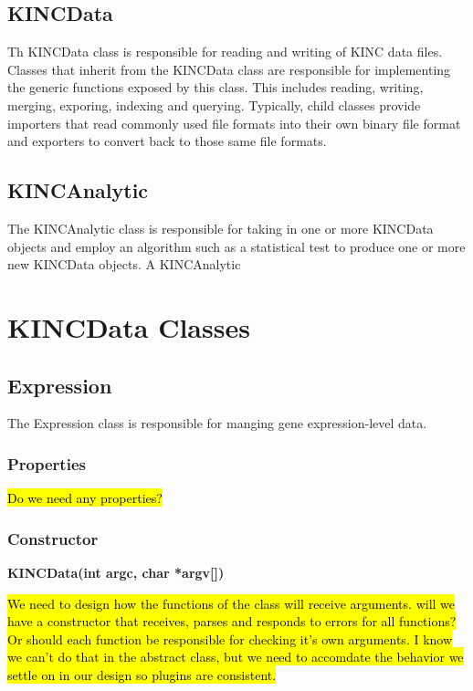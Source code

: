 \documentclass[10pt]{article}
\begin{document}
\subsection{KINCData}

Th KINCData class is responsible for reading and writing of KINC data files.  
Classes that inherit from the KINCData class are responsible for implementing 
the generic functions exposed by this class.  This includes reading, writing, 
merging, exporing, indexing and querying. Typically, child classes provide 
importers that read commonly used file formats into their own binary file 
format and exporters to convert back to those same file formats.

\subsection{KINCAnalytic}

The KINCAnalytic class is responsible for taking in one or more KINCData objects
and employ an algorithm such as a statistical test to produce one or more 
new KINCData objects.   A KINCAnalytic 

\newpage
\section{KINCData Classes}

\subsection{Expression}

The Expression class is responsible for manging gene expression-level data.  

\subsubsection{Properties}

\hl{Do we need any properties?}

\subsubsection{Constructor}

{\bfseries KINCData(int argc, char *argv[])}

\hl{We need to design how the functions of the class will receive arguments. 
 will we have a constructor that receives, parses and responds to errors
 for all functions?  Or should each function be responsible for checking 
 it's own arguments. I know we can't do that in the abstract class, but 
 we need to accomdate the behavior we settle on in our design so plugins
 are consistent.}
\end{document}
